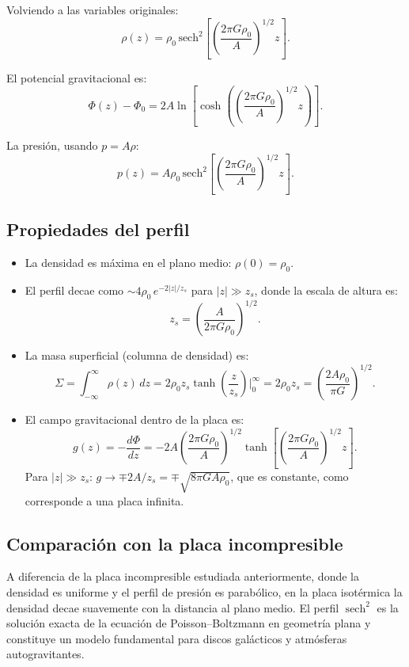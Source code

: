 Volviendo a las variables originales:
$$
\boxed{\rho(z) = \rho_0\,\text{sech}^2\!\left[\left(\frac{2\pi G\rho_0}{A}\right)^{1/2}z\right].}
$$

El potencial gravitacional es:
$$
\Phi(z) - \Phi_0 = 2A\ln\!\left[\cosh\!\left(\left(\frac{2\pi G\rho_0}{A}\right)^{1/2}z\right)\right].
$$

La presión, usando $p = A\rho$:
$$
\boxed{p(z) = A\rho_0\,\text{sech}^2\!\left[\left(\frac{2\pi G\rho_0}{A}\right)^{1/2}z\right].}
$$

\subsection{Propiedades del perfil}

\begin{itemize}
    \item La densidad es máxima en el plano medio: $\rho(0) = \rho_0$.
    \item El perfil decae como $\sim 4\rho_0\,e^{-2|z|/z_s}$ para $|z| \gg z_s$, donde la escala de altura es:
    $$
    z_s = \left(\frac{A}{2\pi G\rho_0}\right)^{1/2}.
    $$
    \item La masa superficial (columna de densidad) es:
    $$
    \Sigma = \int_{-\infty}^{\infty}\rho(z)\,dz = 2\rho_0 z_s\tanh\!\left(\frac{z}{z_s}\right)\bigg|_0^{\infty} = 2\rho_0 z_s = \left(\frac{2A\rho_0}{\pi G}\right)^{1/2}.
    $$
    \item El campo gravitacional dentro de la placa es:
    $$
    g(z) = -\frac{d\Phi}{dz} = -2A\left(\frac{2\pi G\rho_0}{A}\right)^{1/2}\tanh\!\left[\left(\frac{2\pi G\rho_0}{A}\right)^{1/2}z\right].
    $$
    Para $|z| \gg z_s$: $g \to \mp 2A/z_s = \mp\sqrt{8\pi G A\rho_0}$, que es constante, como corresponde a una placa infinita.
\end{itemize}

\subsection{Comparación con la placa incompresible}

A diferencia de la placa incompresible estudiada anteriormente, donde la densidad es uniforme y el perfil de presión es parabólico, en la placa isotérmica la densidad decae suavemente con la distancia al plano medio. El perfil $\operatorname{sech}^2$ es la solución exacta de la ecuación de Poisson--Boltzmann en geometría plana y constituye un modelo fundamental para discos galácticos y atmósferas autogravitantes.

